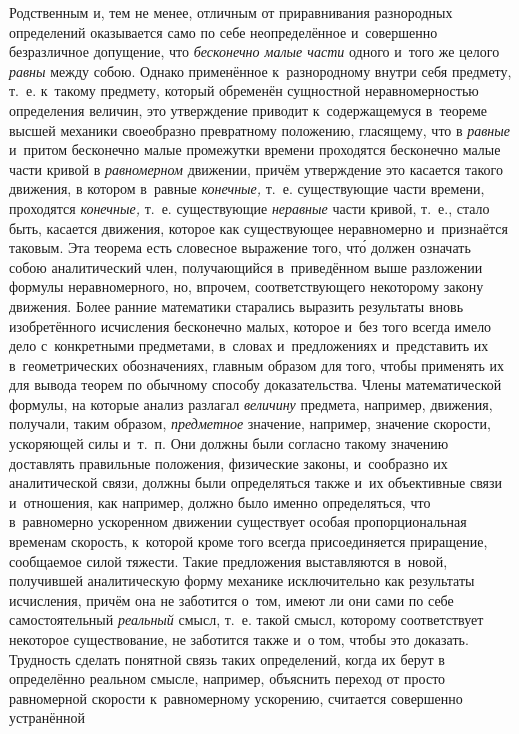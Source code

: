 Родственным и, тем не менее, отличным от приравнивания разнородных определений
оказывается само по себе неопределённое и~совершенно безразличное допущение,
что {\em бесконечно малые части} одного и~того же целого {\em равны} между
собою. Однако применённое к~разнородному внутри себя предмету, т.~е. к~такому
предмету, который обременён сущностной неравномерностью определения
величин, это утверждение приводит к~содержащемуся в~теореме высшей механики
своеобразно превратному положению, гласящему, что в {\em равные} и~притом
бесконечно малые промежутки времени проходятся бесконечно малые части кривой
в {\em равномерном} движении, причём утверждение это касается такого движения,
в котором в~равные {\em конечные,} т.~е. существующие части времени, проходятся
{\em конечные,} т.~е. существующие {\em неравные} части кривой, т.~е., стало
быть, касается движения, которое как существующее неравномерно и~признаётся
таковым. Эта теорема есть словесное выражение того, чт\'{о} должен означать собою
аналитический член, получающийся в~приведённом выше разложении формулы
неравномерного, но, впрочем, соответствующего некоторому закону движения. Более
ранние математики старались выразить результаты вновь изобретённого исчисления
бесконечно малых, которое и~без того всегда имело дело с~конкретными
предметами, в~словах и~предложениях и~представить их в~геометрических
обозначениях, главным образом для того, чтобы применять их для вывода теорем по
обычному способу доказательства. Члены математической формулы, на которые
анализ разлагал {\em величину} предмета, например, движения, получали, таким
образом, {\em предметное} значение, например, значение скорости, ускоряющей
силы и~т.~п. Они должны были согласно такому значению доставлять правильные
положения, физические законы, и~сообразно их аналитической связи, должны были
определяться также и~их объективные связи и~отношения, как например, должно
было именно определяться, что в~равномерно ускоренном движении существует
особая пропорциональная временам скорость, к~которой кроме того всегда
присоединяется приращение, сообщаемое силой тяжести. Такие предложения
выставляются в~новой, получившей аналитическую форму механике исключительно как
результаты исчисления, причём она не заботится о~том, имеют ли они сами по себе
самостоятельный {\em реальный} смысл, т.~е. такой смысл, которому соответствует
некоторое существование, не заботится также и~о том, чтобы это доказать.
Трудность сделать понятной связь таких определений, когда их берут в
определённо реальном смысле, например, объяснить переход от просто равномерной
скорости к~равномерному ускорению, считается совершенно устранённой
